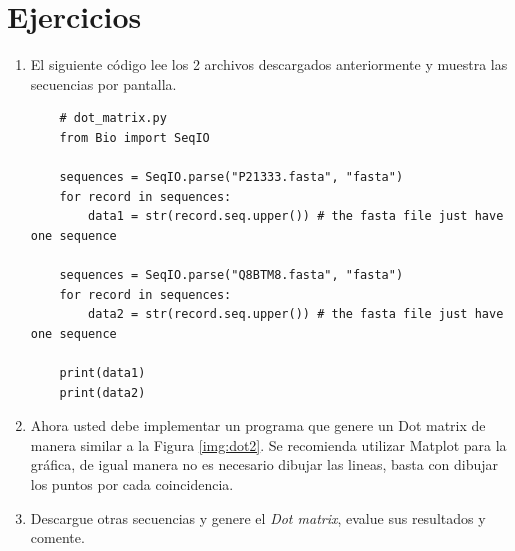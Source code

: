 \documentclass{article}
\begin{document}
\section{Ejercicios}\label{sec:ejercicios}
\begin{enumerate}
 \item El siguiente código lee los 2 archivos descargados anteriormente y muestra las secuencias por pantalla.
    \begin{lstlisting}
    # dot_matrix.py
    from Bio import SeqIO

    sequences = SeqIO.parse("P21333.fasta", "fasta")
    for record in sequences:
        data1 = str(record.seq.upper()) # the fasta file just have one sequence 
    
    sequences = SeqIO.parse("Q8BTM8.fasta", "fasta")
    for record in sequences:
        data2 = str(record.seq.upper()) # the fasta file just have one sequence  
    
    print(data1)
    print(data2)
    \end{lstlisting}
 
    \item Ahora usted debe implementar un programa que genere un Dot matrix de manera similar a la Figura  \ref{img:dot2}. Se recomienda utilizar Matplot para la gráfica, de igual manera no es necesario dibujar las lineas, basta con dibujar los puntos por cada coincidencia.
    
    \item Descargue otras secuencias y genere el \textit{Dot matrix}, evalue sus resultados y comente.
\end{enumerate}


\clearpage


\end{document}
